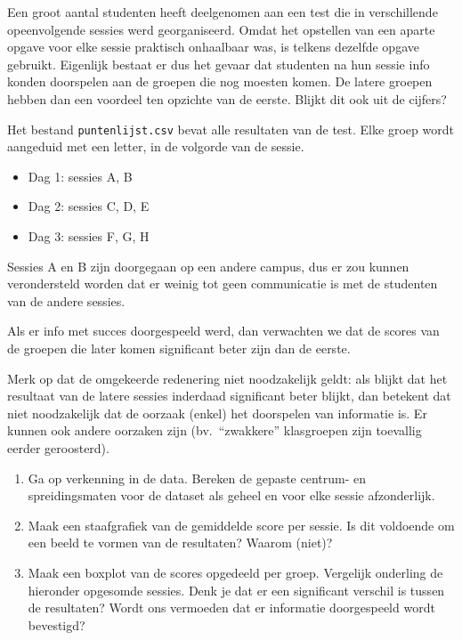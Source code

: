 \begin{exercise}
  Een groot aantal studenten heeft deelgenomen aan een test die in verschillende opeenvolgende sessies werd georganiseerd. Omdat het opstellen van een aparte opgave voor elke sessie praktisch onhaalbaar was, is telkens dezelfde opgave gebruikt. Eigenlijk bestaat er dus het gevaar dat studenten na hun sessie info konden doorspelen aan de groepen die nog moesten komen. De latere groepen hebben dan een voordeel ten opzichte van de eerste. Blijkt dit ook uit de cijfers?
  
  Het bestand \texttt{puntenlijst.csv} bevat alle resultaten van de test. Elke groep wordt aangeduid met een letter, in de volgorde van de sessie.
  
  \begin{itemize}
    \item Dag 1: sessies A, B
    \item Dag 2: sessies C, D, E
    \item Dag 3: sessies F, G, H
  \end{itemize}

  Sessies A en B zijn doorgegaan op een andere campus, dus er zou kunnen verondersteld worden dat er weinig tot geen communicatie is met de studenten van de andere sessies.
  
  Als er info met succes doorgespeeld werd, dan verwachten we dat de scores van de groepen die later komen significant beter zijn dan de eerste.
  
  Merk op dat de omgekeerde redenering niet noodzakelijk geldt: als blijkt dat het resultaat van de latere sessies inderdaad significant beter blijkt, dan betekent dat niet noodzakelijk dat de oorzaak (enkel) het doorspelen van informatie is. Er kunnen ook andere oorzaken zijn (bv.~``zwakkere'' klasgroepen zijn toevallig eerder geroosterd).
  
  \begin{enumerate}
    \item Ga op verkenning in de data. Bereken de gepaste centrum- en spreidingsmaten voor de dataset als geheel en voor elke sessie afzonderlijk.
    
    \item Maak een staafgrafiek van de gemiddelde score per sessie. Is dit voldoende om een beeld te vormen van de resultaten? Waarom (niet)?
    
    \item Maak een boxplot van de scores opgedeeld per groep. Vergelijk onderling de hieronder opgesomde sessies. Denk je dat er een significant verschil is tussen de resultaten? Wordt ons vermoeden dat er informatie doorgespeeld wordt bevestigd?
    

\end{enumerate}
\end{exercise}
